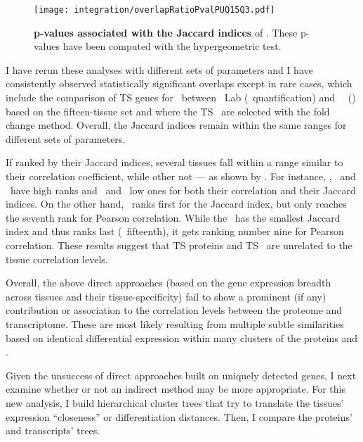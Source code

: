 \begin{figure}[!ht]
    \texttt{[image: integration/overlapRatioPvalPUQ15Q3.pdf]}\centering
    \caption[p-values associated with the Jaccard indices]{%
\label{fig:JaccardPvalues}\label{fig:pJacquard}%
    \textbf{p-values associated with the Jaccard indices} of .
    These p-values have been computed with the hypergeometric test.}
    \vspace{-3mm}
\end{figure}

I have rerun these analyses with different sets of parameters
and I have consistently observed statistically significant overlaps
except in rare cases,
which include the comparison of \gls{TS} genes for \Bladder\
between \pandey\ Lab (\PPKM\ quantification) and \uhlen\ \etal\ (\htseq)
based on the fifteen-tissue set and where the \gls{TS} \mRNAs\ are selected
with the fold change method.
Overall, the Jaccard indices remain within the same ranges
for different sets of parameters.\mybr\

If ranked by their Jaccard indices,
several tissues fall within a range similar to their correlation coefficient,
while other not --- as shown by \Cref{fig:compCorJind}.
For instance, \Liver, \Testis\ and \Pancreas\ have high ranks
and \Bladder\ and \Gallbladder\ low ones
for both their correlation and their Jaccard indices.
On the other hand,
\Kidney\ ranks first for the Jaccard index,
but only reaches the seventh rank for Pearson correlation.
While the \Rectum\ has the smallest Jaccard index
and thus ranks last (\ie\ fifteenth),
it gets ranking number nine for Pearson correlation.
These results suggest that
\gls{TS} proteins and \gls{TS} \mRNAs\ are unrelated to
the tissue correlation levels.\mybr\

Overall, the above direct approaches
(based on the gene expression breadth across tissues and their tissue-specificity)
fail to show a prominent (if any) contribution or association
to the correlation levels between the proteome and transcriptome.
These are most likely resulting
from multiple subtle similarities
based on identical differential expression
within many clusters of the proteins and \mRNAs{}.\mybr\

Given the unsuccess of direct approaches built on uniquely detected genes,
I next examine whether or not an indirect method may be more appropriate.
For this new analysis,
I build hierarchical cluster trees that try to translate
the tissues' expression \enquote{closeness} or differentiation distances.
Then, I compare the proteins' and transcripts' trees.\mybr\


